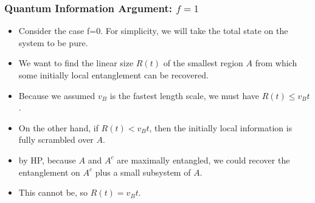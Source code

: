 \documentclass[10pt,aspectratio=169]{beamer}
\begin{document}
\begin{frame}
\frametitle{Quantum Information Argument: $f=1$}


\begin{itemize}

\item Consider the case f=0. For simplicity, we will take the total state on the system to be pure.

\item We want to find the linear size $R(t)$ of the smallest region $A$ from which some initially local entanglement can be recovered.

\item Because we assumed $v_B$ is the fastest length scale, we must have $R(t) \leq v_B t$.

\item On the other hand, if $R(t)<v_B t$, then the initially local information is fully scrambled over $A$.

\item by HP, because $A$ and $A^{c}$ are maximally entangled, we could recover the entanglement on $A^{c}$ plus a small subsystem of $A$.

\item This cannot be, so $R(t) = v_B t$.

\end{itemize}

%

    
    


\end{frame}
\end{document}
